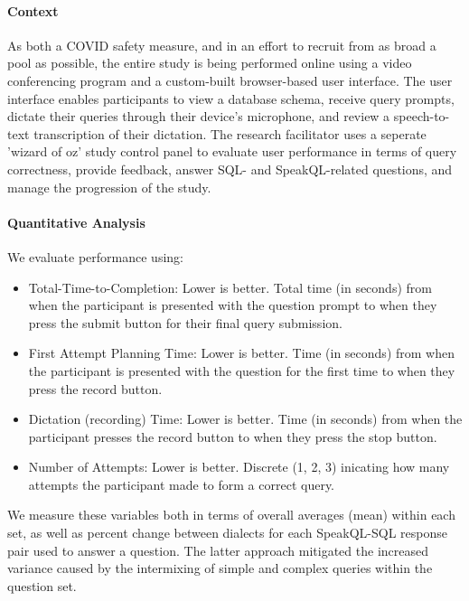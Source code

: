 \paragraph{Context} 

As both a COVID safety measure, and in an effort to recruit from as broad a pool as possible, the entire study is being performed online using a video conferencing program and a custom-built browser-based user interface. The  user interface enables participants to view a database schema, receive query prompts, dictate their queries through their device's microphone, and review a speech-to-text transcription of their dictation. The research facilitator uses a seperate 'wizard of oz' study control panel to evaluate user performance in terms of query correctness, provide feedback, answer SQL- and SpeakQL-related questions, and manage the progression of the study. 

\paragraph{Quantitative Analysis}

We evaluate performance using:

\begin{itemize}
  \item Total-Time-to-Completion: Lower is better. Total time (in seconds) from when the participant is presented with the question prompt to when they press the submit button for their final query submission.
  \item First Attempt Planning Time: Lower is better. Time (in seconds) from when the participant is presented with the question for the first time to when they press the record button.
  \item Dictation (recording) Time: Lower is better. Time (in seconds) from when the participant presses the record button to when they press the stop button.
  \item Number of Attempts: Lower is better. Discrete (1, 2, 3) inicating how many attempts the participant made to form a correct query.
\end{itemize}

We measure these variables both in terms of overall averages (mean) within each set, as well as percent change between dialects for each SpeakQL-SQL response pair used to answer a question. The latter approach mitigated the increased variance caused by the intermixing of simple and complex queries within the question set.

